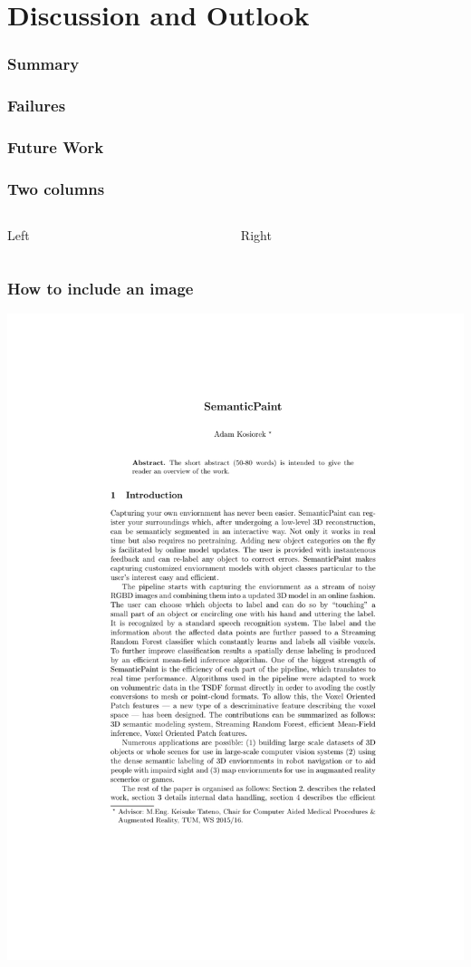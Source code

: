 \documentclass[mathserif, 8pt]{beamer}
\begin{document}
\section{Discussion and Outlook}
\begin{frame}
\frametitle{Summary}

\end{frame}

\begin{frame}
\frametitle{Failures}

\end{frame}

\begin{frame}
\frametitle{Future Work}

\end{frame}



\begin{frame}
\frametitle{Two columns}
\begin{columns}[t]
\begin{column}{0.45\linewidth}
Left
\end{column}
\begin{column}{0.45\linewidth}
Right
\end{column}
\end{columns}
\end{frame}


\begin{frame}
\frametitle{How to include an image}
\begin{center}
\includegraphics[width=0.3\linewidth]{template}
\end{center}
\end{frame}
\end{document}
